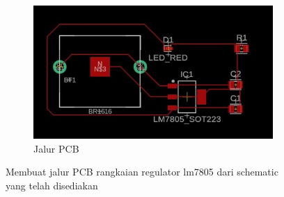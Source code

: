 \begin{enumerate}
\begin{figure}[H]
\begin{subfigure}[b]{0.45\linewidth}
      \centering
      \includegraphics[width=\linewidth]{img/buatpcb(2).jpg}
      \caption{Jalur PCB\label{fig:inisub2}}
    \end{subfigure}
    \caption{Membuat jalur PCB rangkaian regulator lm7805 dari schematic yang telah disediakan\label{fig:keduagambar}}
  \end{figure}
\end{enumerate}
